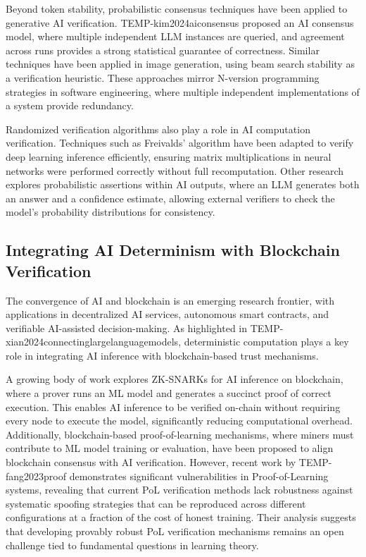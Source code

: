 \documentclass{article}
\begin{document}
Beyond token stability, probabilistic consensus techniques have been applied to generative AI verification. TEMP-kim2024aiconsensus proposed an AI consensus model, where multiple independent LLM instances are queried, and agreement across runs provides a strong statistical guarantee of correctness. Similar techniques have been applied in image generation, using beam search stability as a verification heuristic. These approaches mirror N-version programming strategies in software engineering, where multiple independent implementations of a system provide redundancy.

Randomized verification algorithms also play a role in AI computation verification. Techniques such as Freivalds’ algorithm have been adapted to verify deep learning inference efficiently, ensuring matrix multiplications in neural networks were performed correctly without full recomputation. Other research explores probabilistic assertions within AI outputs, where an LLM generates both an answer and a confidence estimate, allowing external verifiers to check the model’s probability distributions for consistency.

\subsection{Integrating AI Determinism with Blockchain Verification}

The convergence of AI and blockchain is an emerging research frontier, with applications in decentralized AI services, autonomous smart contracts, and verifiable AI-assisted decision-making. As highlighted in TEMP-xian2024connectinglargelanguagemodels, deterministic computation plays a key role in integrating AI inference with blockchain-based trust mechanisms.

A growing body of work explores ZK-SNARKs for AI inference on blockchain, where a prover runs an ML model and generates a succinct proof of correct execution. This enables AI inference to be verified on-chain without requiring every node to execute the model, significantly reducing computational overhead. Additionally, blockchain-based proof-of-learning mechanisms, where miners must contribute to ML model training or evaluation, have been proposed to align blockchain consensus with AI verification. However, recent work by TEMP-fang2023proof demonstrates significant vulnerabilities in Proof-of-Learning systems, revealing that current PoL verification methods lack robustness against systematic spoofing strategies that can be reproduced across different configurations at a fraction of the cost of honest training. Their analysis suggests that developing provably robust PoL verification mechanisms remains an open challenge tied to fundamental questions in learning theory.
\end{document}
